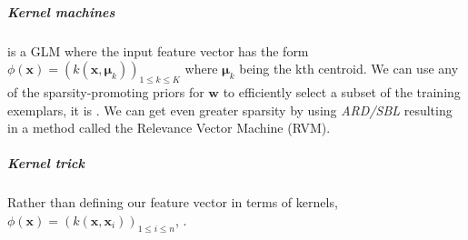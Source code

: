 \subparagraph{Kernel machines}
is a GLM where the input feature vector has the form $\phi(\bm{x}) = \left(
k(\bm{x}, \bm{\mu}_{k})\right)_{1\leq k\leq K}$ where $\bm{\mu}_{k}$ being the kth 
centroid.
We can use any of the sparsity-promoting priors for $\bm{w}$ to efficiently select a 
subset of the training exemplars, it is .
We can get even greater sparsity by using \emph{ARD/SBL} resulting in a method called
the Relevance Vector Machine (RVM).
\subparagraph{Kernel trick}
Rather than defining our feature vector in terms of kernels, $\phi(\bm{x}) = \left(
k(\bm{x},\bm{x}_{i})\right)_{1\leq i\leq n}$, .

